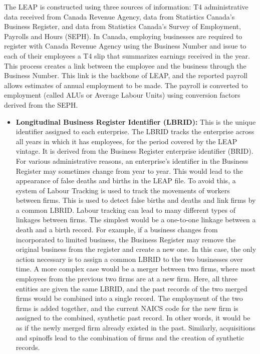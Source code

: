 \documentclass{article}
\begin{document}
The LEAP is constructed using three sources of information: T4 administrative data received from Canada Revenue Agency, data from Statistics Canada's Business Register, and data from Statistics Canada's Survey of Employment, Payrolls and Hours (SEPH). In Canada, employing businesses are required to register with Canada Revenue Agency using the Business Number and issue to each of their employees a T4 slip that summarizes earnings received in the year. This process creates a link between the employee and the business through the Business Number. This link is the backbone of LEAP, and the reported payroll allows estimates of annual employment to be made. The payroll is converted to employment (called ALUs or Average Labour Units) using conversion factors derived from the SEPH. 
\begin{itemize}
\item \textbf{Longitudinal Business Register Identifier (LBRID):} This is the unique identifier assigned to each enterprise.  The LBRID tracks the enterprise across all years in which it has employees, for the period covered by the LEAP vintage. It is derived from the Business Register enterprise identifier (BRID).  For various administrative reasons, an enterprise's identifier in the Business Register may sometimes change from year to year.  This would lead to the appearance of false deaths and births in the LEAP file.  To avoid this, a system of Labour Tracking is used to track the movements of workers between firms.  This is used to detect false births and deaths and link firms by a common LBRID.  Labour tracking can lead to many different types of linkages between firms. The simplest would be a one-to-one linkage between a death and a birth record. For example, if a business changes from incorporated to limited business, the Business Register may remove the original business from the register and create a new one. In this case, the only action necessary is to assign a common LBRID to the two businesses over time. A more complex case would be a merger between two firms, where most employees from the previous two firms are at a new firm. Here, all three entities are given the same LBRID, and the past records of the two merged firms would be combined into a single record. The employment of the two firms is added together, and the current NAICS code for the new firm is assigned to the combined, synthetic past record. In other words, it would be as if the newly merged firm already existed in the past. Similarly, acquisitions and spinoffs lead to the combination of firms and the creation of synthetic records. 

\end{itemize}
\end{document}
